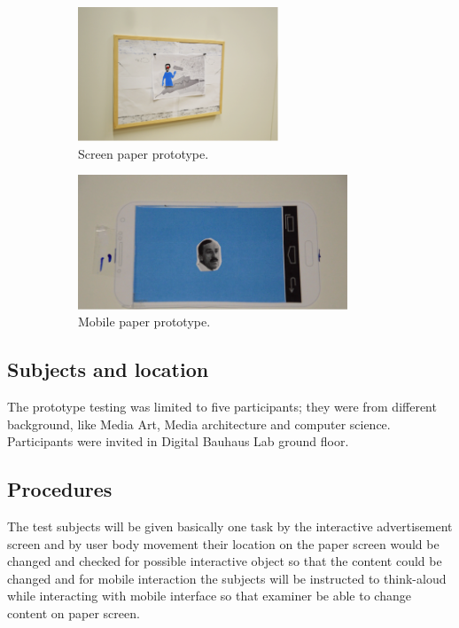 \begin{figure}[H]
    \centering
    \begin{subfigure}[H]{0.45\textwidth}
        \centering
        \includegraphics[width=\textwidth,height=4cm]{Figures/5/paper_board}
        \caption{Screen paper prototype.}
        \label{fig:screen_proto}
    \end{subfigure}
    \hfill
    \begin{subfigure}[H]{0.45\textwidth}
        \centering
        \includegraphics[width=\textwidth,height=4cm]{Figures/5/mobile_paper}
        \caption{Mobile paper prototype.}
        \label{fig:mobileproto}
    \end{subfigure}
    \caption{}
    \label{fig:paper_prototype_screen}
\end{figure}


\subsection{Subjects and location}
The prototype testing was limited to five participants; they were from different background, like Media Art, Media architecture and computer science. Participants were invited in Digital Bauhaus Lab ground floor.


\subsection{Procedures}
The test subjects will be given basically one task by the interactive advertisement screen and by user body movement their location on the paper screen would be changed and checked for possible interactive object so that the content could be changed and for mobile interaction the subjects will be instructed to think-aloud while interacting with mobile interface so that examiner be able to change content on paper screen.



